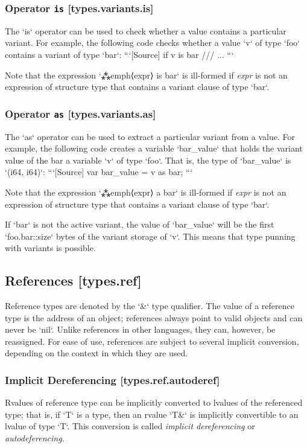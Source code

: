 \documentclass[a4paper, 12pt, oneside, final]{article}
\begin{document}
\subsubsection{Operator \texttt{is} [types.variants.is]}
The `is` operator can be used to check whether a value contains a particular variant. For example, the following
code checks whether a value `v` of type `foo` contains a variant of type `bar`:
```[Source]
if v is bar {
    /// ...
}
```

Note that the expression `⁂emph⟨expr⟩ is bar` is ill-formed if \emph{expr} is not an expression of
structure type that contains a variant clause of type `bar`.

\subsubsection{Operator \texttt{as} [types.variants.as]}
The `as` operator can be used to extract a particular variant from a value. For example, the following code
creates a variable `bar_value` that holds the variant value of the bar a variable `v` of type `foo`.
That is, the type of `bar_value` is `(i64, i64)`:
```[Source]
var bar_value = v as bar;
```

Note that the expression `⁂emph⟨expr⟩ a bar` is ill-formed if \emph{expr} is not an expression of
structure type that contains a variant clause of type `bar`.

If `bar` is not the active variant, the value of `bar_value` will be the first
`foo.bar::size` bytes of the variant storage of `v`. This means that type punning
with variants is possible.

\subsection{References [types.ref]}
Reference types are denoted by the `&` type qualifier. The value of a reference type is the address of an object; references
always point to valid objects and can never be `nil`. Unlike references in other languages, they can, however, be reassigned.
For ease of use, references are subject to several implicit conversion, depending on the context in which they are used.

\subsubsection{Implicit Dereferencing [types.ref.autoderef]}
Rvalues of reference type can be implicitly converted to lvalues of the referenced type; that is, if `T` is a type, then
an rvalue `T&` is implicitly convertible to an lvalue of type `T`. This conversion is called \emph{implicit dereferencing}
or \emph{autodeferencing}.
\end{document}
